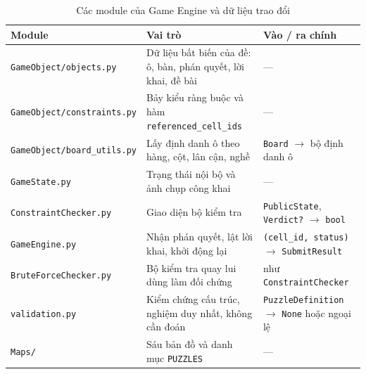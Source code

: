 \begin{sloppypar}
\begin{table}[htbp]
  \centering\small
  \caption{Các module của Game Engine và dữ liệu trao đổi}
  \label{tab:module_roles}
  \begin{tabularx}{\textwidth}{l>{\raggedright\arraybackslash}X>{\raggedright\arraybackslash}X}
    \toprule
    \textbf{Module} & \textbf{Vai trò} & \textbf{Vào / ra chính} \\
    \midrule
    \texttt{GameObject/objects.py}     & Dữ liệu bất biến của đề: ô, bàn, phán quyết, lời khai, đề bài & --- \\
    \texttt{GameObject/constraints.py} & Bảy kiểu ràng buộc và hàm \texttt{referenced\_cell\_ids} & --- \\
    \texttt{GameObject/board\_utils.py}& Lấy định danh ô theo hàng, cột, lân cận, nghề & \texttt{Board} $\to$ bộ định danh ô \\
    \texttt{GameState.py}              & Trạng thái nội bộ và ảnh chụp công khai & --- \\
    \texttt{ConstraintChecker.py}      & Giao diện bộ kiểm tra & \texttt{PublicState}, \texttt{Verdict?} $\to$ \texttt{bool} \\
    \texttt{GameEngine.py}             & Nhận phán quyết, lật lời khai, khởi động lại & \texttt{(cell\_id, status)} $\to$ \texttt{SubmitResult} \\
    \texttt{BruteForceChecker.py}      & Bộ kiểm tra quay lui dùng làm đối chứng & như \texttt{ConstraintChecker} \\
    \texttt{validation.py}             & Kiểm chứng cấu trúc, nghiệm duy nhất, không cần đoán & \texttt{PuzzleDefinition} $\to$ \texttt{None} hoặc ngoại lệ \\
    \texttt{Maps/}                     & Sáu bản đồ và danh mục \texttt{PUZZLES} & --- \\
    \bottomrule
  \end{tabularx}
\end{table}
\end{sloppypar}
